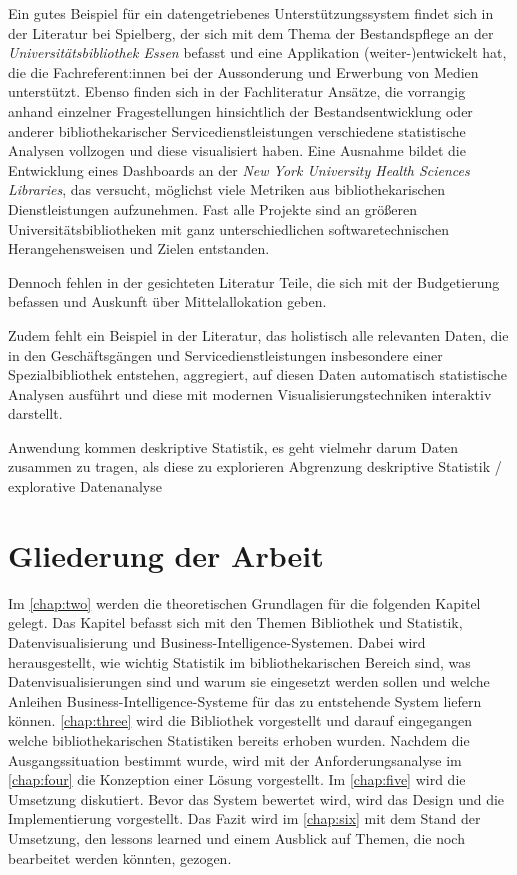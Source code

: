 Ein gutes Beispiel für ein datengetriebenes Unterstützungssystem findet sich in
der Literatur bei Spielberg, der sich mit dem Thema der Bestandspflege an der
\textit{Universitätsbibliothek Essen} befasst und eine Applikation (weiter-)entwickelt hat, die
die Fachreferent:innen bei der Aussonderung und Erwerbung von Medien
unterstützt.\cite{spielberg_eike_t_fachref-assistent_nodate}
Ebenso finden sich in der Fachliteratur Ansätze, die vorrangig anhand einzelner
Fragestellungen hinsichtlich der Bestandsentwicklung\cite{hughes_long-term_2016} oder anderer
bibliothekarischer Servicedienstleistungen\cite{kutlay_shiny_2020, knievel_use_2006,meyer_using_2018} verschiedene statistische Analysen
vollzogen und diese visualisiert haben.
Eine Ausnahme bildet die Entwicklung eines Dashboards an der \textit{New York
University Health Sciences Libraries}, das versucht, möglichst viele Metriken
aus bibliothekarischen Dienstleistungen aufzunehmen.\cite{morton-owens_trends_2012}
Fast alle Projekte sind an größeren
Universitätsbibliotheken mit ganz unterschiedlichen softwaretechnischen
Herangehensweisen\cite{finch_using_2016, wiegand_visualizing_2013} und Zielen\cite{phetteplace_effectively_2012} entstanden.

Dennoch fehlen in der gesichteten Literatur Teile, die sich mit der Budgetierung
befassen und Auskunft über Mittelallokation geben.

Zudem fehlt ein Beispiel in der Literatur, das holistisch alle relevanten Daten, die in den
Geschäftsgängen und Servicedienstleistungen insbesondere einer Spezialbibliothek entstehen,
aggregiert, auf diesen Daten automatisch statistische Analysen ausführt und diese mit modernen Visualisierungstechniken
interaktiv darstellt.

Anwendung kommen deskriptive Statistik, es geht vielmehr darum Daten zusammen zu tragen, als diese zu explorieren 
Abgrenzung deskriptive Statistik / explorative Datenanalyse

\section{Gliederung der Arbeit}
Im \autoref{chap:two} werden die theoretischen Grundlagen für die folgenden Kapitel gelegt. Das Kapitel befasst
sich mit den Themen Bibliothek und Statistik, Datenvisualisierung und Business-Intelligence-Systemen. Dabei wird herausgestellt, wie wichtig Statistik
im bibliothekarischen Bereich sind, was Datenvisualisierungen sind und warum sie eingesetzt werden sollen und welche Anleihen Business-Intelligence-Systeme 
für das zu entstehende System liefern können. \autoref{chap:three}
wird die Bibliothek vorgestellt und darauf eingegangen welche bibliothekarischen Statistiken bereits erhoben wurden.
Nachdem die Ausgangssituation bestimmt wurde, wird mit der Anforderungsanalyse im \autoref{chap:four} die Konzeption einer Lösung vorgestellt.
Im \autoref{chap:five} wird die Umsetzung diskutiert. Bevor das System bewertet wird, wird das Design und die Implementierung vorgestellt.
Das Fazit wird im \autoref{chap:six} mit dem Stand der Umsetzung, den lessons learned und einem Ausblick auf Themen, die noch bearbeitet werden könnten, gezogen.
